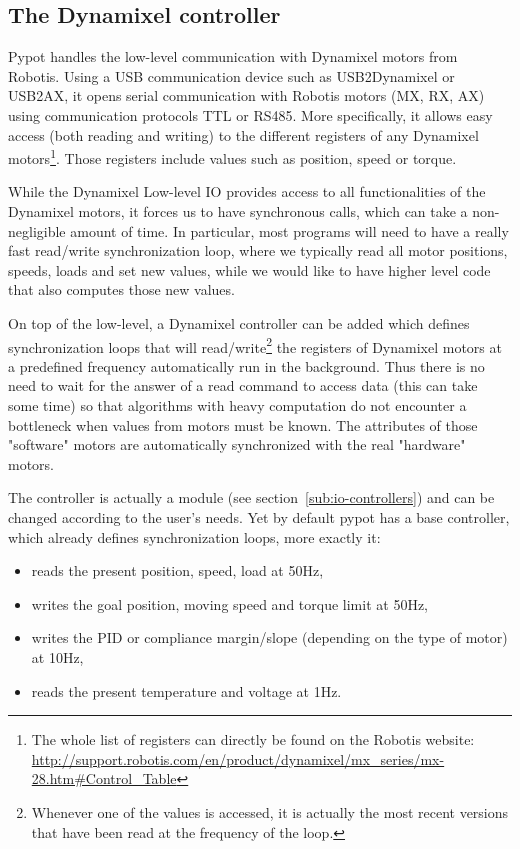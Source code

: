 \subsection{The Dynamixel controller} %
\label{sub:dynamixel-controller}

Pypot handles the low-level communication with Dynamixel motors from Robotis. Using a USB communication device such as USB2Dynamixel or USB2AX, it opens serial communication with Robotis motors (MX, RX, AX) using communication protocols TTL or RS485. More specifically, it allows easy access (both reading and writing) to the different registers of any Dynamixel motors\footnote{The whole list of registers can directly be found on the Robotis website: \url{http://support.robotis.com/en/product/dynamixel/mx_series/mx-28.htm\#Control_Table}}. Those registers include values such as position, speed or torque.


While the Dynamixel Low-level IO provides access to all functionalities of the Dynamixel motors, it forces us to have synchronous calls, which can take a non-negligible amount of time. In particular, most programs will need to have a really fast read/write synchronization loop, where we typically read all motor positions, speeds, loads and set new values, while we would like to have higher level code that also computes those new values.

On top of the low-level, a Dynamixel controller can be added which defines synchronization loops that will read/write\footnote{Whenever one of the values is accessed, it is actually the most recent versions that have been read at the frequency of the loop.} the registers of Dynamixel motors at a predefined frequency automatically run in the background. Thus there is no need to wait for the answer of a read command to access data (this can take some time) so that algorithms with heavy computation do not encounter a bottleneck when values from motors must be known. The attributes of those "software" motors are automatically synchronized with the real "hardware" motors.

The controller is actually a module (see section~\ref{sub:io-controllers}) and can be changed according to the user’s needs. Yet by default pypot has a base controller, which already defines synchronization loops, more exactly it:

\begin{itemize}
    \item reads the present position, speed, load at 50Hz,
    \item writes the goal position, moving speed and torque limit at 50Hz,
    \item writes the PID or compliance margin/slope (depending on the type of motor) at 10Hz,
    \item reads the present temperature and voltage at 1Hz.
\end{itemize}

